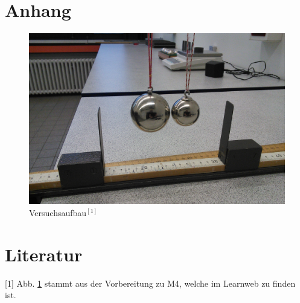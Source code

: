 \documentclass[11pt,a4paper,titlepage, ngerman]{article}
\begin{document}
	\newpage
	
	\section{Anhang} %
	
	
	\begin{figure}[ht]
		\centering
		\includegraphics[width=\textwidth]{M4_1.jpg}
		\caption{Versuchsaufbau$^{[1]}$}
		\label{abb:VersuchsaufbauStoss}	
	\end{figure}
	
	\section*{Literatur}
	
	
	[1] Abb. \ref*{abb:VersuchsaufbauStoss} stammt aus der Vorbereitung zu M4, welche im Learnweb zu finden ist.
	
\end{document}
